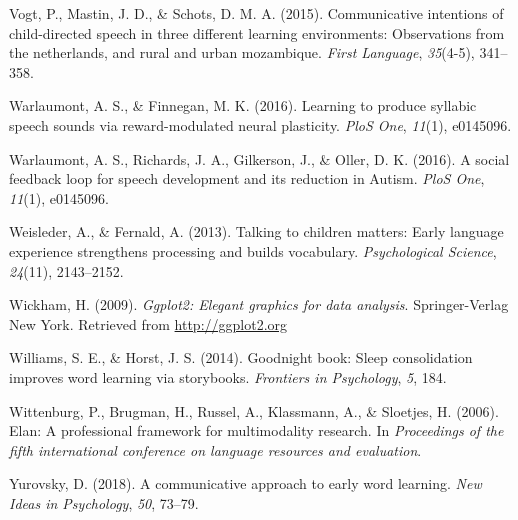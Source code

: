 \documentclass[floatsintext,man]{apa6}
\theoremstyle{definition}
\theoremstyle{definition}
\theoremstyle{definition}
\theoremstyle{remark}
\begin{document}
\hypertarget{ref-vogt2015communicative}{}
Vogt, P., Mastin, J. D., \& Schots, D. M. A. (2015). Communicative
intentions of child-directed speech in three different learning
environments: Observations from the netherlands, and rural and urban
mozambique. \emph{First Language}, \emph{35}(4-5), 341--358.

\hypertarget{ref-warlaumont2016learning}{}
Warlaumont, A. S., \& Finnegan, M. K. (2016). Learning to produce
syllabic speech sounds via reward-modulated neural plasticity.
\emph{PloS One}, \emph{11}(1), e0145096.

\hypertarget{ref-warlaumont2014social}{}
Warlaumont, A. S., Richards, J. A., Gilkerson, J., \& Oller, D. K.
(2016). A social feedback loop for speech development and its reduction
in Autism. \emph{PloS One}, \emph{11}(1), e0145096.

\hypertarget{ref-weisleder2013talking}{}
Weisleder, A., \& Fernald, A. (2013). Talking to children matters: Early
language experience strengthens processing and builds vocabulary.
\emph{Psychological Science}, \emph{24}(11), 2143--2152.

\hypertarget{ref-R-ggplot2}{}
Wickham, H. (2009). \emph{Ggplot2: Elegant graphics for data analysis}.
Springer-Verlag New York. Retrieved from \url{http://ggplot2.org}

\hypertarget{ref-williams2014goodnight}{}
Williams, S. E., \& Horst, J. S. (2014). Goodnight book: Sleep
consolidation improves word learning via storybooks. \emph{Frontiers in
Psychology}, \emph{5}, 184.

\hypertarget{ref-ELAN}{}
Wittenburg, P., Brugman, H., Russel, A., Klassmann, A., \& Sloetjes, H.
(2006). Elan: A professional framework for multimodality research. In
\emph{Proceedings of the fifth international conference on language
resources and evaluation}.

\hypertarget{ref-yurovsky2018communicative}{}
Yurovsky, D. (2018). A communicative approach to early word learning.
\emph{New Ideas in Psychology}, \emph{50}, 73--79.

\endgroup
\end{document}
